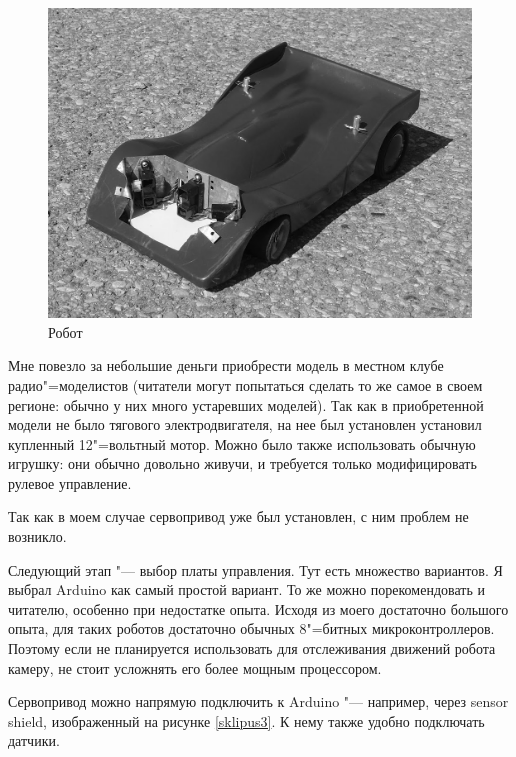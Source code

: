 \documentclass[10pt, a5paper]{article}
\begin{document}
\begin{figure}[h!]
  \centering 
  \includegraphics[scale=0.15]{12_2015_fig2}
  \caption{Робот}\label{sklipus2}
\end{figure}

Мне повезло за небольшие деньги приобрести модель в местном клубе радио"=моделистов (читатели могут попытаться сделать то же самое в своем регионе: обычно у них много устаревших моделей). Так как в приобретенной модели не было тягового электродвигателя, на нее был установлен установил купленный 12"=вольтный мотор. Можно было также использовать обычную игрушку: они обычно довольно живучи, и требуется только модифицировать рулевое управление.

Так как в моем случае сервопривод уже был установлен, с ним проблем не возникло.

Следующий этап "--- выбор платы управления. Тут есть множество вариантов. Я выбрал Arduino как самый простой вариант. То же можно порекомендовать и читателю, особенно при недостатке опыта. Исходя из моего достаточно большого опыта, для таких роботов достаточно обычных 8"=битных микроконтроллеров. Поэтому если не планируется использовать для отслеживания движений робота камеру, не стоит усложнять его более мощным процессором.

Сервопривод можно напрямую подключить к Arduino "--- например, через sensor shield, изображенный на рисунке \ref{sklipus3}. К нему также удобно подключать датчики.
\end{document}
